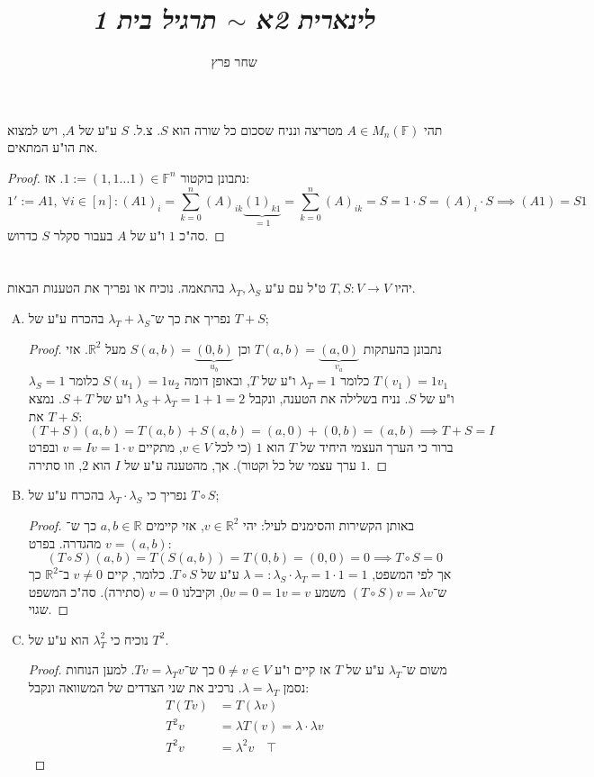 \documentclass[]{article}
\author{שחר פרץ}
\title{\textit{לינארית 2א $\sim$ תרגיל בית 1}}
\newcommand\R     {\mathbb{R}}
\newcommand\One   {\mathit{1}}
\newcommand\F         {\mathbb{F}}
\newcommand\co        {\colon}
\renewcommand\lg      {\lambda}
\theoremstyle{definition}
\begin{document}
	\maketitle
	\section{}
	תהי $A \in M_n(\F)$ מטריצה ונניח שסכום כל שורה הוא $S$. צ.ל. $S$ ע"ע של $A$, ויש למצוא את הו"ע המתאים. 
	\begin{proof}
		נתבונן בוקטור $\One := (1, 1 \dots 1) \in \F^{n}$. אז: 
		\[ \One' := A\One, \ \forall i \in [n] \co (A\One)_i = \sum_{k = 0}^{n}(A)_{ik}\underbrace{(1)_{k1}}_{=1} = \sum_{k = 0}^{n} (A)_{ik} = S  = 1 \cdot S = (A)_i \cdot S \implies (A\One) = S\One \]
		סה"כ $\One$ ו"ע של $A$ בעבור סקלר $S$ כדרוש. 
	\end{proof}
	\section{}
	יהיו $T, S \co V \to V$ ט"ל עם ע"ע $\lg_T, \lg_S$ בהתאמה. נוכיח או נפריך את הטענות הבאות. 
	\begin{enumerate}[A)]
		\item נפריך את כך ש־$\lg_T + \lg_S$ בהכרח ע"ע של $T + S$; \begin{proof}
			נתבונן בהעתקות $T(a, b) = \underbrace{(a, 0)}_{v_a}$ וכן $S(a, b) = \underbrace{(0, b)}_{u_b}$ מעל $\R^2$. אזי $T(v_1) = 1v_1$ כלומר $\lg_T = 1$ ו"ע של $T$, ובאופן דומה $S(u_1) = 1u_2$ כלומר $\lg_S = 1$ ו"ע של $S$. נניח בשלילה את הטענה, ונקבל $\lg_S + \lg_T = 1 + 1 = 2$ ו"ע של $S + T$. נמצא את $T + S$: 
		\[ (T + S)(a, b) = T(a, b) + S(a, b) = (a, 0) + (0, b) = (a, b) \implies T + S = I \]
			ברור כי הערך העצמי היחיד של $T$ הוא $1$ (כי לכל $v \in V$, מתקיים $v = Iv = 1 \cdot v$ ובפרט $1$ ערך עצמי של כל וקטור). אך, מהטענה ע"ע של $I$ הוא $2$, וזו סתירה. 
		\end{proof}
		\item נפריך כי $\lg_T \cdot \lg_S$ בהכרח ע"ע של $T \circ S$; \begin{proof}
			באותן הקשירות והסימנים לעיל: יהי $v \in \R^2$, אזי קיימים $a, b \in \R$ כך ש־$v = (a, b)$ מהגדרה. בפרט: 
			\[ (T \circ S)(a, b) = T(S(a, b)) = T(0, b) = (0, 0) = 0 \implies T \circ S = 0 \]
			אך לפי המשפט, $\lg =: \lg_S \cdot \lg_T = 1 \cdot 1 = 1$ ע"ע של $T \circ S$. כלומר, קיים $v \neq 0$ ב־$\R^2$ כך ש־$(T \circ S)v = \lg v$ משמע $0v = 0 = 1v = v$, וקיבלנו $v = 0$ (סתירה). סה"כ המשפט שגוי. 
		\end{proof}
		\item נוכיח כי $\lg_T^2$ הוא ע"ע של $T^2$. \begin{proof}
			משום ש־$\lg_T$ ע"ע של $T$ אז קיים ו"ע $0 \neq v \in V$ כך ש־$Tv = \lg_Tv$. למען הנוחות נסמן $\lg = \lg_T$. נרכיב את שני הצדדים של המשוואה ונקבל: 
			\begin{align*}
				T(Tv) &= T(\lg v) \\
				T^2 v &= \lg T(v) = \lg \cdot \lg v \\
				T^2 v &= \lg^2 v \quad\top
			\end{align*}
		\end{proof}
	\end{enumerate}
	
\end{document}
